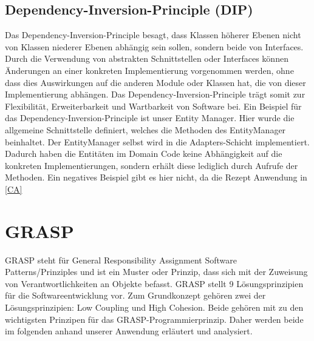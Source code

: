 \subsection{Dependency-Inversion-Principle (DIP)}
Das Dependency-Inversion-Principle besagt, dass Klassen höherer Ebenen nicht von Klassen niederer Ebenen abhängig sein sollen, sondern beide von Interfaces. Durch die Verwendung von abstrakten Schnittstellen oder Interfaces können Änderungen an einer konkreten Implementierung vorgenommen werden, ohne dass dies Auswirkungen auf die anderen Module oder Klassen hat, die von dieser Implementierung abhängen. Das Dependency-Inversion-Principle trägt somit zur Flexibilität, Erweiterbarkeit und Wartbarkeit von Software bei.
Ein Beispiel für das Dependency-Inversion-Principle ist unser Entity Manager. Hier wurde die allgemeine Schnittstelle  definiert, welches die Methoden des EntityManager beinhaltet. Der EntityManager selbst wird in die Adapters-Schicht implementiert. Dadurch haben die Entitäten im Domain Code keine Abhängigkeit auf die konkreten Implementierungen, sondern erhält diese lediglich durch Aufrufe der Methoden. Ein negatives Beispiel gibt es hier nicht, da die Rezept Anwendung in \autoref{CA} 

\section{GRASP}
GRASP steht für General Responsibility Assignment Software Patterns/Prinziples und ist ein Muster oder Prinzip, dass sich mit der Zuweisung von Verantwortlichkeiten an Objekte befasst. GRASP stellt 9 Lösungsprinzipien für die Softwareentwicklung vor. Zum Grundkonzept gehören zwei der Lösungsprinzipien: Low Coupling und High Cohesion. Beide gehören mit zu den wichtigsten Prinzipen für das GRASP-Programmierprinzip. Daher werden beide im folgenden anhand unserer Anwendung erläutert und analysiert.

